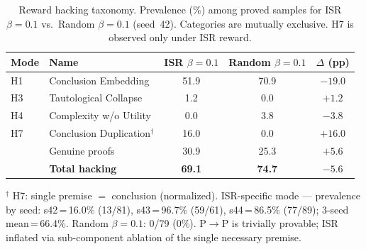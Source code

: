 \begin{table}[t]
\centering
\caption{Reward hacking taxonomy. Prevalence (\%) among proved samples for ISR $\beta{=}0.1$ vs.\ Random $\beta{=}0.1$ (seed~42). Categories are mutually exclusive. H7 is observed only under ISR reward.}
\label{tab:hacking-taxonomy}
\begin{tabular}{@{}llccc@{}}
\toprule
Mode & Name & ISR $\beta{=}0.1$ & Random $\beta{=}0.1$ & $\Delta$ (pp) \\
\midrule
H1 & Conclusion Embedding   & 51.9 & 70.9 & $-19.0$ \\
H3 & Tautological Collapse  &  1.2 &  0.0 &  $+1.2$ \\
H4 & Complexity w/o Utility  &  0.0 &  3.8 &  $-3.8$ \\
H7 & Conclusion Duplication$^\dagger$ & 16.0 &  0.0 & $+16.0$ \\
\midrule
   & Genuine proofs         & 30.9 & 25.3 & $\mathbf{+5.6}$  \\
   & \textbf{Total hacking} & \textbf{69.1} & \textbf{74.7} & $\mathbf{-5.6}$ \\
\bottomrule
\end{tabular}

\vspace{4pt}
{\footnotesize
$^\dagger$ H7: single premise $=$ conclusion (normalized). ISR-specific mode --- prevalence by seed: s42\,=\,16.0\% (13/81), s43\,=\,96.7\% (59/61), s44\,=\,86.5\% (77/89); 3-seed mean\,=\,66.4\%. Random $\beta{=}0.1$: 0/79 (0\%). P$\to$P is trivially provable; ISR inflated via sub-component ablation of the single necessary premise.
}
\end{table}
